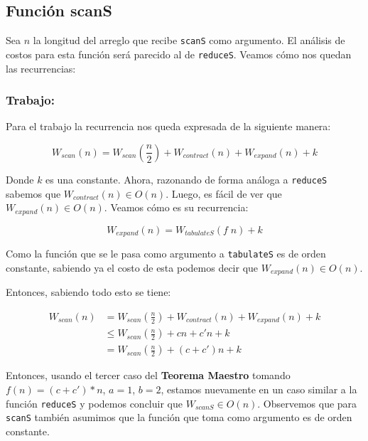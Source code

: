 \documentclass[11pt]{article}
\begin{document}
\subsection{Función scanS}

Sea $n$ la longitud del arreglo que recibe \texttt{scanS} como argumento. El
análisis de costos para esta función será parecido al de \texttt{reduceS}. Veamos
cómo nos quedan las recurrencias:

\subsubsection{Trabajo:}

Para el trabajo la recurrencia nos queda expresada de la siguiente manera:

\begin{equation*}
    W_{scan}(n) = W_{scan}(\frac{n}{2}) + W_{contract}(n) + W_{expand}(n) + k
\end{equation*}

Donde $k$ es una constante. Ahora, razonando de forma análoga a \texttt{reduceS} sabemos 
que \newline $W_{contract}(n) \in O(n)$. Luego, es fácil de ver que $W_{expand}(n) \in O(n)$. 
Veamos cómo es su recurrencia:

\begin{equation*}
    W_{expand}(n) = W_{tabulateS}(f \; n) + k 
\end{equation*}

Como la función que se le pasa como argumento a \texttt{tabulateS} es de orden
constante, sabiendo ya el costo de esta podemos decir que
$W_{expand}(n) \in O(n)$.

Entonces, sabiendo todo esto se tiene:

\begin{align*}
    W_{scan}(n) & = W_{scan}(\frac{n}{2}) + W_{contract}(n) + W_{expand}(n) + k \\
                & \leq W_{scan}(\frac{n}{2}) + cn + c'n + k \\
                & = W_{scan}(\frac{n}{2}) + (c + c')n + k 
\end{align*}

Entonces, usando el tercer caso del \textbf{Teorema Maestro} tomando $f(n) = (c+c')*n$, $a = 1$, $b = 2$, 
estamos nuevamente en un caso similar a la función \texttt{reduceS} y podemos
concluir que $W_{scanS} \in O(n)$. Observemos que para \texttt{scanS} también
asumimos que la función que toma como argumento es de orden constante. 
\end{document}
